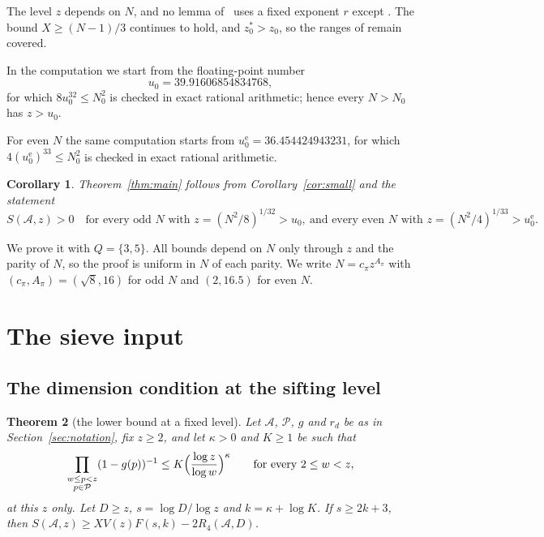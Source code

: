 \documentclass[preprint,11pt]{elsarticle}
\newtheorem{theorem}{Theorem}[section]
\newtheorem{corollary}[theorem]{Corollary}
\theoremstyle{definition}
\theoremstyle{remark}
\newcommand{\cA}{\mathcal{A}}
\newcommand{\cP}{\mathcal{P}}
\newcommand{\C}{\cite{Campbell2026}}
\numberwithin{equation}{section}
\begin{document}
The level $z$ depends on $N$, and no lemma of~\C{} uses a fixed exponent
$r$ except \cite[Lemma~5.2]{Campbell2026}. The bound $X\ge(N-1)/3$
continues to hold, and $z_0^*>z_0$, so the ranges of
\cite[Lemma~4.1]{Campbell2026} remain covered.

In the computation we start from the floating-point number
\[
  u_0=39.91606854834768,
\]
for which $8u_0^{32}\le N_0^2$ is checked in exact rational arithmetic;
hence every $N>N_0$ has $z>u_0$.

For even $N$ the same computation starts from
$u_0^{\mathrm{e}}=36.454424943231$, for which $4(u_0^{\mathrm{e}})^{33}\le N_0^2$
is checked in exact rational arithmetic.

\begin{corollary}\label{cor:reduction}
Theorem~\ref{thm:main} follows from Corollary~\ref{cor:small} and the
statement
\[
  S(\cA,z)>0\quad\text{for every odd } N \text{ with }
  z=(N^2/8)^{1/32}>u_0,\ \text{and every even } N \text{ with }
  z=(N^2/4)^{1/33}>u_0^{\mathrm{e}} .
\]
\end{corollary}

We prove it with $Q=\{3,5\}$. All bounds depend on $N$ only through $z$
and the parity of $N$, so the proof is uniform in $N$ of each parity. We
write $N=c_\pi z^{A_\pi}$ with $(c_\pi,A_\pi)=(\sqrt8,16)$ for odd $N$ and
$(2,16.5)$ for even $N$.

\section{The sieve input}\label{sec:sieve}

\subsection{The dimension condition at the sifting level}\label{subsec:local}

\begin{theorem}[the lower bound at a fixed level]\label{thm:local}
Let $\cA$, $\cP$, $g$ and $r_d$ be as in Section~\ref{sec:notation}, fix
$z\ge2$, and let $\kappa>0$ and $K\ge1$ be such that
\begin{equation}\label{eq:dimlocal}
  \prod_{\substack{w\le p<z\\ p\in\cP}}(1-g(p))^{-1}
  \le K\Bigl(\frac{\log z}{\log w}\Bigr)^{\kappa}
  \qquad\text{for every } 2\le w<z,
\end{equation}
at this $z$ only. Let $D\ge z$, $s=\log D/\log z$ and $k=\kappa+\log K$.
If $s\ge2k+3$, then $S(\cA,z)\ge XV(z)F(s,k)-2R_4(\cA,D)$.
\end{theorem}
\end{document}
